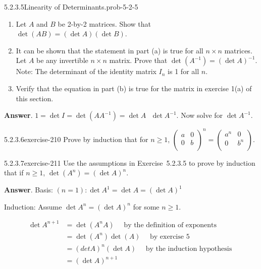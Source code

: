 \documentclass[twoside,10pt,]{book}
\numberwithin{equation}{section}
\begin{document}
\begin{divisionsolution}{5.2.3.5}{Linearity of Determinants.}{prob-5-2-5}%
\hypertarget{p-1827}{}%
\leavevmode%
\begin{enumerate}[label=(\alph*)]
\item\hypertarget{li-968}{}Let \(A\) and \(B\) be 2-by-2 matrices. Show that \(\det (A B) =(\det  A)(\det  B)\).%
\item\hypertarget{li-969}{}It can be shown that the statement in part (a) is true for all \(n\times n\) matrices. Let \(A\) be any invertible \(n\times n\) matrix. Prove that \(\det \left(A^{-1}\right) =(\det  A)^{-1}\). Note: The determinant of the identity matrix \(I_n\) is 1 for all \(n\).%
\item\hypertarget{li-970}{}Verify that the equation in part (b) is true for the matrix in exercise 1(a) of this section.%
\end{enumerate}
%
\par\smallskip%
\noindent\textbf{Answer}.\quad%
\hypertarget{p-1828}{}%
\(1=\det  I=\det \left(AA^{-1}\right)=\det  A\text{  }\det  A^{-1}\). Now solve for \(\det  A^{-1}\).%
\end{divisionsolution}%
\begin{divisionsolution}{5.2.3.6}{}{exercise-210}%
\hypertarget{p-1829}{}%
Prove by induction that for \(n \geq 1\), \(\left(
\begin{array}{cc}
a & 0 \\
0 & b \\
\end{array}
\right)^n= \left(
\begin{array}{cc}
a^n & 0 \\
0 & b^n \\
\end{array}
\right)\).%
\end{divisionsolution}%
\begin{divisionsolution}{5.2.3.7}{}{exercise-211}%
\hypertarget{p-1830}{}%
Use the assumptions in Exercise~5.2.3.5 to prove by induction that if \(n \geq 1\), \(\det \left(A^n\right) = (\det  A)^n\).%
\par\smallskip%
\noindent\textbf{Answer}.\quad%
\hypertarget{p-1831}{}%
Basis: \((n=1): \det  A^1=\det  A =(\det  A )^1\)%
\par
\hypertarget{p-1832}{}%
Induction: Assume \(\det  A^n=(\det  A)^n\) for some \(n\geq 1\).%
\par
\hypertarget{p-1833}{}%
%
\begin{equation*}
\begin{split}
\det  A^{n+1} & =\det \left(A^nA\right)\quad \textrm{ by the definition of exponents}\\
&=\det \left(A^n\right)\det (A)\quad \textrm{ by exercise 5} \\
&=(det  A)^n(\det  A)\quad \textrm{ by the induction hypothesis }\\
&=(\det  A)^{n+1}
\end{split}
\end{equation*}
%
\end{divisionsolution}%
\end{document}
